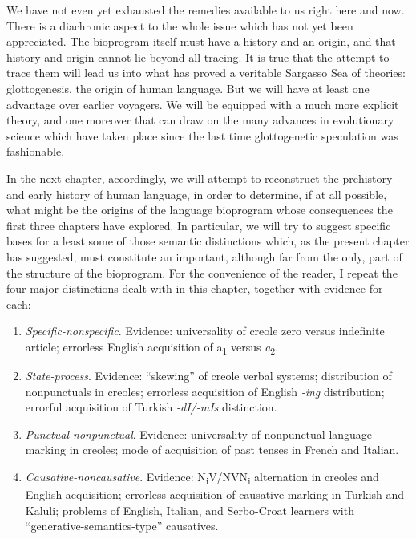 We have not even yet exhausted the remedies available to us right here and now. There is a diachronic aspect to the whole issue which has not yet been appreciated. The bioprogram itself must have a history and an origin, and that history and origin cannot lie beyond all tracing. It is true that the attempt to trace them will lead us into what has proved a veritable Sargasso Sea of theories: glottogenesis, the origin of human language. But we will have at least one advantage over earlier voyagers. We will be equipped with a much more explicit theory, and one moreover that can draw on the many advances in evolutionary science which have taken place since the last time glottogenetic speculation was fashionable.


In the next chapter, accordingly, we will attempt to reconstruct the prehistory and early history of human language, in order to determine, if at all possible, what might be the origins of the language bioprogram whose consequences the first three chapters have explored. In particular, we will try to suggest specific bases for a least some of those semantic distinctions which, as the present chapter has suggested, must constitute an important, although far from the only, part of the structure of the bioprogram. For the convenience of the reader, I repeat the four major distinctions dealt with in this chapter, together with evidence for each: 

\begin{enumerate}
	
\item\textit{Specific-nonspecific}. Evidence: universality of creole zero versus indefinite article; errorless English acquisition of a\textsubscript{1} versus \textit{a}\textsubscript{2}.

\item\textit{State-process}. Evidence: ``skewing'' of creole verbal systems; distribution of nonpunctuals in creoles; errorless acquisition of English \textit{-ing} distribution; errorful acquisition of Turkish \textit{-dI/-mIs} distinction. 

\item\textit{Punctual-nonpunctual}. Evidence: universality of nonpunctual language marking in creoles; mode of acquisition of past tenses in French and Italian. 

\item\textit{Causative-noncausative}. Evidence: N\textsubscript{i}V/NVN\textsubscript{i} alternation in creoles and English acquisition; errorless acquisition of causative marking in Turkish and Kaluli; problems of English, Italian, and Serbo-Croat learners with ``generative-semantics-type'' causatives.
\end{enumerate}

